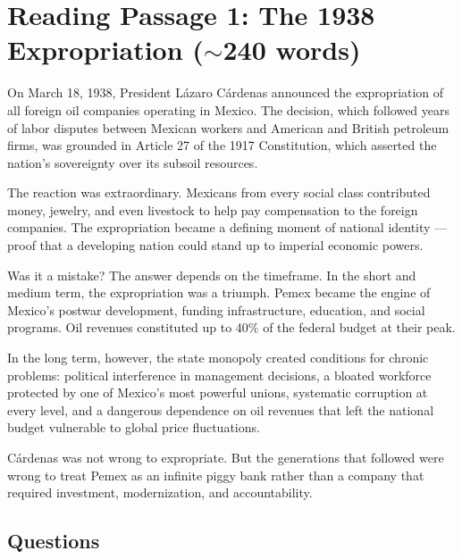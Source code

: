 \documentclass[10pt,a4paper]{article}
\begin{document}
\section*{Reading Passage 1: The 1938 Expropriation ($\sim$240 words)}

\begin{tcolorbox}[colback=white, colframe=black]
\small
On March 18, 1938, President L\'azaro C\'ardenas announced the
expropriation of all foreign oil companies operating in Mexico. The
decision, which followed years of labor disputes between Mexican
workers and American and British petroleum firms, was grounded in
Article 27 of the 1917 Constitution, which asserted the nation's
sovereignty over its subsoil resources.

The reaction was extraordinary. Mexicans from every social class
contributed money, jewelry, and even livestock to help pay
compensation to the foreign companies. The expropriation became a
defining moment of national identity --- proof that a developing
nation could stand up to imperial economic powers.

Was it a mistake? The answer depends on the timeframe. In the short
and medium term, the expropriation was a triumph. Pemex became the
engine of Mexico's postwar development, funding infrastructure,
education, and social programs. Oil revenues constituted up to 40\%
of the federal budget at their peak.

In the long term, however, the state monopoly created conditions for
chronic problems: political interference in management decisions,
a bloated workforce protected by one of Mexico's most powerful
unions, systematic corruption at every level, and a dangerous
dependence on oil revenues that left the national budget vulnerable
to global price fluctuations.

C\'ardenas was not wrong to expropriate. But the generations that
followed were wrong to treat Pemex as an infinite piggy bank rather
than a company that required investment, modernization, and
accountability.
\end{tcolorbox}

\subsection*{Questions}
\end{document}
